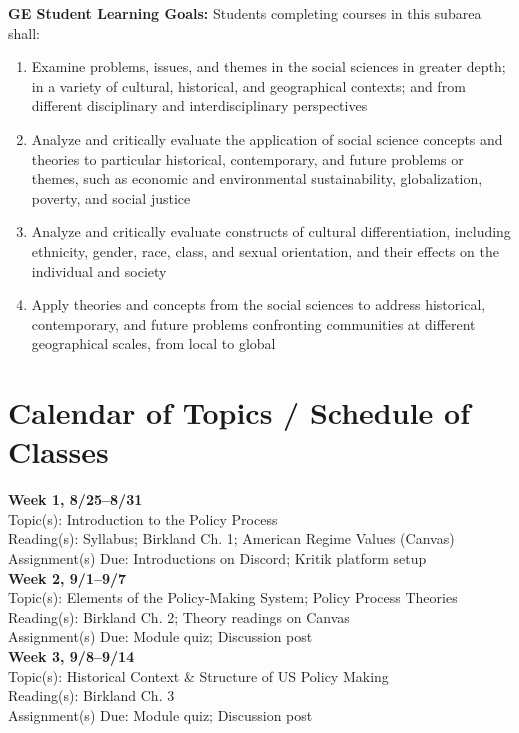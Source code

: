 \documentclass[12pt]{article}     %
\begin{document}
\vspace{0.5em}
\noindent \textbf{GE Student Learning Goals:}
Students completing courses in this subarea shall:
\begin{enumerate}
\item Examine problems, issues, and themes in the social sciences in greater depth; in a variety of cultural, historical, and geographical contexts; and from different disciplinary and interdisciplinary perspectives
\item Analyze and critically evaluate the application of social science concepts and theories to particular historical, contemporary, and future problems or themes, such as economic and environmental sustainability, globalization, poverty, and social justice
\item Analyze and critically evaluate constructs of cultural differentiation, including ethnicity, gender, race, class, and sexual orientation, and their effects on the individual and society
\item Apply theories and concepts from the social sciences to address historical, contemporary, and future problems confronting communities at different geographical scales, from local to global
\end{enumerate}

\section*{Calendar of Topics / Schedule of Classes}

\noindent \textbf{Week 1, 8/25--8/31}\\
Topic(s): Introduction to the Policy Process\\
Reading(s): Syllabus; Birkland Ch. 1; American Regime Values (Canvas)\\
Assignment(s) Due: Introductions on Discord; Kritik platform setup\\

\noindent \textbf{Week 2, 9/1--9/7}\\
Topic(s): Elements of the Policy-Making System; Policy Process Theories\\
Reading(s): Birkland Ch. 2; Theory readings on Canvas\\
Assignment(s) Due: Module quiz; Discussion post\\

\noindent \textbf{Week 3, 9/8--9/14}\\
Topic(s): Historical Context \& Structure of US Policy Making\\
Reading(s): Birkland Ch. 3\\
Assignment(s) Due: Module quiz; Discussion post\\
\end{document}
